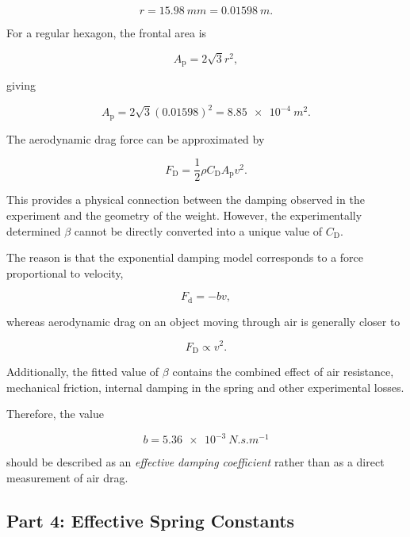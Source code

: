 \documentclass[12pt,a4paper]{article}
\begin{document}
\begin{equation}
r=\SI{15.98}{mm}
=
\SI{0.01598}{m}.
\end{equation}

For a regular hexagon, the frontal area is

\begin{equation}
A_{\mathrm p}=2\sqrt{3}r^2,
\end{equation}

giving

\begin{equation}
A_{\mathrm p}
=
2\sqrt{3}(0.01598)^2
=
\boxed{\SI{8.85e-4}{m^2}}.
\end{equation}

The aerodynamic drag force can be approximated by

\begin{equation}
F_{\mathrm D}
=
\frac{1}{2}\rho C_{\mathrm D}A_{\mathrm p}v^2.
\end{equation}

This provides a physical connection between the damping observed in the experiment and the geometry of the weight. However, the experimentally determined $\beta$ cannot be directly converted into a unique value of $C_{\mathrm D}$.

The reason is that the exponential damping model corresponds to a force proportional to velocity,

\begin{equation}
F_{\mathrm d}=-bv,
\end{equation}

whereas aerodynamic drag on an object moving through air is generally closer to

\begin{equation}
F_{\mathrm D}\propto v^2.
\end{equation}

Additionally, the fitted value of $\beta$ contains the combined effect of air resistance, mechanical friction, internal damping in the spring and other experimental losses.

Therefore, the value

\begin{equation}
b=\SI{5.36e-3}{N.s.m^{-1}}
\end{equation}

should be described as an \textit{effective damping coefficient} rather than as a direct measurement of air drag.

\subsection{Part 4: Effective Spring Constants}
\end{document}
